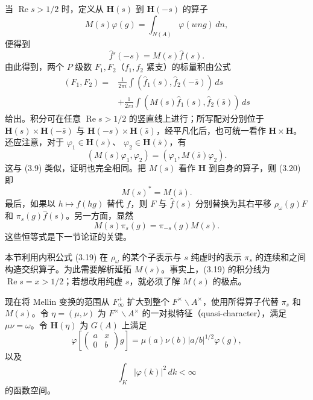 当 $\operatorname{Re}s>1/2$ 时，定义从 $\mathbf H(s)$ 到 $\mathbf H(-s)$ 的算子
\begin{equation}
 M(s)\varphi(g)=\int_{N(A)}\varphi(wng)\,dn,\tag{3.17}
\end{equation}
便得到
\begin{equation}
 \widehat f'(-s)=M(s)\widehat f(s).\tag{3.18}
\end{equation}
由此得到，两个 $P$ 级数 $F_1,F_2$（$f_1,f_2$ 紧支）的标量积由公式
\begin{equation}
\begin{split}
 (F_1,F_2)={}&\frac1{2\pi i}\int(\widehat f_1(s),\widehat f_2(-\bar s))\,ds\\
 &+\frac1{2\pi i}\int(M(s)\widehat f_1(s),\widehat f_2(\bar s))\,ds
\end{split}\tag{3.19}
\end{equation}
给出。积分可在任意 $\operatorname{Re}s>1/2$ 的竖直线上进行；所写配对分别位于
$\mathbf H(s)\times\mathbf H(-\bar s)$ 与 $\mathbf H(-s)\times\mathbf H(\bar s)$，经平凡化后，也可统一看作
$\mathbf H\times\mathbf H$。还应注意，对于 $\varphi_1\in\mathbf H(s)$、
$\varphi_2\in\mathbf H(\bar s)$，有
\begin{equation}
 (M(s)\varphi_1,\varphi_2)=(\varphi_1,M(\bar s)\varphi_2).\tag{3.20}
\end{equation}
这与 (3.9) 类似，证明也完全相同。把 $M(s)$ 看作 $\mathbf H$ 到自身的算子，则 (3.20) 即
\begin{equation}
 M(s)^*=M(\bar s).\tag{3.21}
\end{equation}
最后，如果以 $h\mapsto f(hg)$ 替代 $f$，则 $F$ 与 $\widehat f(s)$ 分别替换为其右平移
$\rho_\omega(g)F$ 和 $\pi_s(g)\widehat f(s)$。另一方面，显然
\begin{equation}
 M(s)\pi_s(g)=\pi_{-s}(g)M(s).\tag{3.22}
\end{equation}
这些恒等式是下一节论证的关键。

本节利用内积公式 (3.19) 在 $\rho_\omega$ 的某个子表示与 $s$ 纯虚时的表示
$\pi_s$ 的连续和之间构造交织算子。为此需要解析延拓 $M(s)$。事实上，(3.19) 的积分线为
$\operatorname{Re}s=x>1/2$；若想改用纯虚 $s$，就必须了解 $M(s)$ 的极点。

现在将 Mellin 变换的范围从 $F_\infty^+$ 扩大到整个 $F^\times\backslash A^\times$，使用所得算子代替 $\pi_s$ 和 $M(s)$。令 $\eta=(\mu,\nu)$ 为
$F^\times\backslash A^\times$ 的一对拟特征（quasi-character），满足 $\mu\nu=\omega$。令
$\mathbf H(\eta)$ 为 $G(A)$ 上满足
\begin{equation}
 \varphi\!\left[\begin{pmatrix}a&x\\0&b\end{pmatrix}g\right]
 =\mu(a)\nu(b)|a/b|^{1/2}\varphi(g),\tag{4.1}
\end{equation}
以及
\begin{equation}
 \int_K|\varphi(k)|^2\,dk<\infty\tag{4.2}
\end{equation}
的函数空间。

